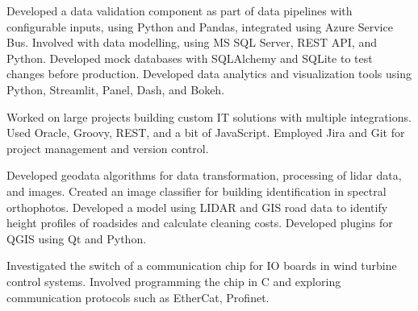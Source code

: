 \documentclass[10pt,a4paper,ragged2e,withhyper]{altacv}
\begin{document}
\begin{paracol}{2}
Developed a data validation component as part of data pipelines with configurable inputs, using Python and Pandas, integrated using Azure Service Bus.
 Involved with data modelling, using MS SQL Server, REST API, and Python.
 Developed mock databases with SQLAlchemy and SQLite to test changes before production.
 Developed data analytics and visualization tools using Python, Streamlit, Panel, Dash, and Bokeh.

             
\divider

Worked on large projects building custom IT solutions with multiple integrations.
 Used Oracle, Groovy, REST, and a bit of JavaScript.
 Employed Jira and Git for project management and version control.

      
\divider

Developed geodata algorithms for data transformation, processing of lidar data, and images.
 Created an image classifier for building identification in spectral orthophotos.
 Developed a model using LIDAR and GIS road data to identify height profiles of roadsides and calculate cleaning costs.
 Developed plugins for QGIS using Qt and Python.

       
\divider

Investigated the switch of a communication chip for IO boards in wind turbine control systems.
 Involved programming the chip in C and exploring communication protocols such as EtherCat, Profinet.

  
\divider







\end{paracol}
\end{document}
